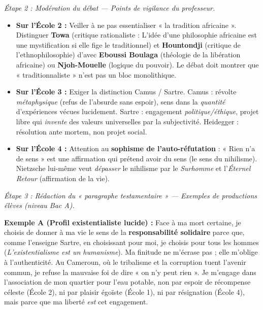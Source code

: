 \documentclass[11pt]{article}
\newcommand{\cle}[1]{{\popxbold\color{popdark}#1}}
\begin{document}
\begin{exoresolu}
\emph{Étape 2 : Modération du débat — Points de vigilance du professeur.}
\begin{itemize}
    \item \textbf{Sur l'École 2 :} Veiller à ne pas essentialiser « la tradition africaine ». Distinguer \textbf{Towa} (critique rationaliste : \guillemotleft L'idée d'une philosophie africaine est une mystification \guillemotright si elle fige le traditionnel) et \textbf{Hountondji} (critique de l'ethnophilosophie) d'avec \textbf{Eboussi Boulaga} (théologie de la libération africaine) ou \textbf{Njoh-Mouelle} (logique du pouvoir). Le débat doit montrer que « traditionnaliste » n'est pas un bloc monolithique.
    \item \textbf{Sur l'École 3 :} Exiger la distinction \cle{Camus} / \cle{Sartre}. Camus : révolte \emph{métaphysique} (refus de l'absurde sans espoir), sens dans la \emph{quantité} d'expériences vécues lucidement. Sartre : engagement \emph{politique/éthique}, projet libre qui \emph{invente} des valeurs universelles par la subjectivité. Heidegger : \cle{résolution} ante mortem, non projet social.
    \item \textbf{Sur l'École 4 :} Attention au \textbf{sophisme de l'auto-réfutation} : « Rien n'a de sens » est une affirmation qui prétend avoir du sens (le sens du nihilisme). Nietzsche lui-même veut \emph{dépasser} le nihilisme par le \emph{Surhomme} et l'\emph{Éternel Retour} (affirmation de la vie).
\end{itemize}

\emph{Étape 3 : Rédaction du « paragraphe testamentaire » — Exemples de productions élèves (niveau Bac A).}

\textbf{Exemple A (Profil existentialiste lucide) :}
\guillemotleft Face à ma mort certaine, je choisis de donner à ma vie le sens de la \textbf{responsabilité solidaire} parce que, comme l'enseigne Sartre, \guillemotleft en choisissant pour moi, je choisis pour tous les hommes \guillemotright (\emph{L'existentialisme est un humanisme}). Ma finitude ne m'écrase pas ; elle m'oblige à l'authenticité. Au Cameroun, où le tribalisme et la corruption tuent l'avenir commun, je refuse la \cle{mauvaise foi} de dire « on n'y peut rien ». Je m'engage dans l'association de mon quartier pour l'eau potable, non par espoir de récompense céleste (École 2), ni par plaisir égoïste (École 1), ni par résignation (École 4), mais parce que ma liberté \emph{est} cet engagement. \guillemotright


\end{exoresolu}
\end{document}
